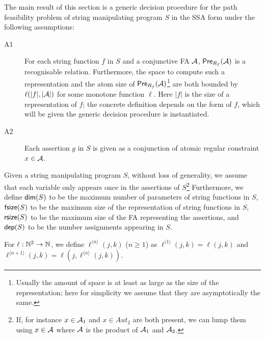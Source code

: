 %

The main result of this section is a generic decision procedure for the path feasibility problem of string manipulating program $S$ in the SSA form under the following assumptions:
\begin{description}
\item[A1] For each string function $f$ in $S$ and a conjunctive FA $\mathcal{A}$,  $\textsf{Pre}_{R_f}(\mathcal{A})$ is a recognisable relation. Furthermore, the space to compute such a representation and the atom size of $\textsf{Pre}_{R_f}(\mathcal{A})$\footnote{Usually the amount of space is at least as large as the size of the representation; here for simplicity we assume that they are asymptotically the same.} are both bounded by $\ell(|f|, |\mathcal{A}|)$ for some monotone function $\ell$. Here $|f|$ is the size of a representation of $f$; the concrete definition depends on the form of $f$, which will be given the generic decision procedure is instantiated.  

\item[A2] Each assertion $g$ in $S$ is given as a conjunction of atomic regular constraint $x\in \mathcal{A}$. 
\end{description} 

Given a string manipulating program $S$, without loss of generality, we assume that each variable only appears once in the assertions of $S$\footnote{If, for instance $x\in \mathcal{A}_1$ and $x\in Aut_2$ are both present, we can lump them using $x\in \mathcal{A}$ where $\mathcal{A}$ is the product of $\mathcal{A}_1$ and $\mathcal{A}_2$.} Furthermore, we define $\mathsf{dim}(S)$ to be the maximum number of parameters of string functions in $S$, $\mathsf{fsize}(S)$ to be the maximum size of the representation of string functions in $S$, $\mathsf{rsize}(S)$ to be the maximum size of the FA representing the assertions,  and $\mathsf{dep}(S)$  to be the number assignments appearing in $S$. 




For $\ell:\mathbb{N}^2\rightarrow \mathbb{N}$, we define $\ell^{\langle n \rangle}(j, k)$ ($n\geq 1$) as $\ell^{\langle 1 \rangle}(j,k)= \ell(j, k)$ and $\ell^{\langle n+1 \rangle }(j, k) = \ell(j, \ell^{\langle n \rangle}(j,k))$. 


